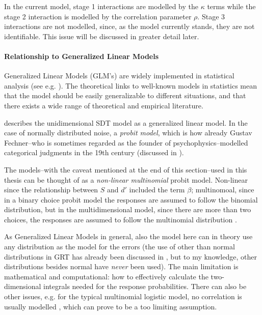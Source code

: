 \documentclass{article}\usepackage{knitr}
\begin{document}
In the current model, stage 1 interactions are modelled by the $\kappa$ terms while the stage 2 interaction is modelled by the correlation parameter $\rho$. Stage 3 interactions are not modelled, since, as the model currently stands, they are not identifiable. This issue will be discussed in greater detail later. 

\paragraph{Relationship to Generalized Linear Models}

Generalized Linear Models (GLM's) are widely implemented in statistical analysis (see e.g. \citet{kruschke2015, skrondahl2004}). The theoretical links to well-known models in statistics mean that the model should be easily generalizable to different situations, and that there exists a wide range of theoretical and empirical literature. 
 
\cite{decarlo1998} describes the unidimensional SDT model as a generalized linear model. In the case of normally distributed noise, a \textit{probit model}, which is how already Gustav Fechner--who is sometimes regarded as the founder of psychophysics--modelled categorical judgments in the 19th century (discussed in \citealt[Chapter 7]{stigler2003}). 

The models--with the caveat mentioned at the end of this section--used in this thesis can be thought of as a \textit{non-linear multinomial} probit model. Non-linear \citep[p. 379]{box2005} since the relationship between $S$ and $d'$ included the term $\beta$; multinomoal, since in a binary choice probit model the responses are assumed to follow the binomial distribution, but in the multidimensional model, since there are more than two choices, the responses are assumed to follow the multinomial distribution \cite{skrondahl2004}. 

As Generalized Linear Models in general, also the model here can in theory use any distribution as the model for the errors (the use of other than normal distributions in GRT has already been discussed in \citet{ashby1986}, but to my knowledge, other distributions besides normal have \textit{never} been used). The main limitation is mathematical and computational: how to effectively calculate the two-dimensional integrals needed for the response probabilities. There can also be other issues, e.g. for the  typical multinomial logistic model, no correlation is usually modelled \citep{skrondahl2004}, which can prove to be a too limiting assumption.
\end{document}
